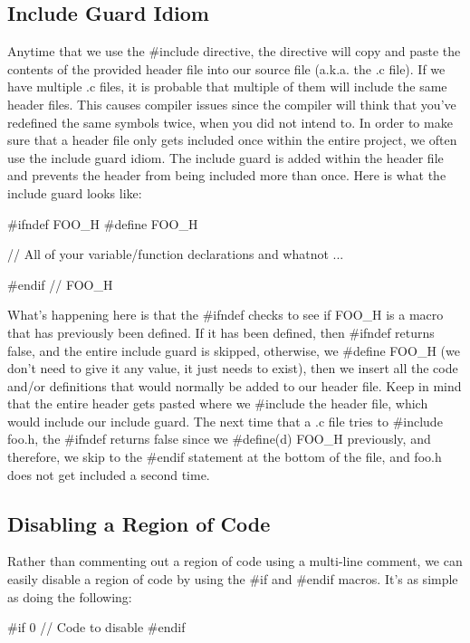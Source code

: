 \documentclass{article}
\begin{document}
\subsection{Include Guard Idiom}

Anytime that we use the \#include directive, the directive will copy and paste the contents of the provided
header file into our source file (a.k.a. the .c file). If we have multiple .c files, it is probable that
multiple of them will include the same header files. This causes compiler issues since the compiler will think
that you've redefined the same symbols twice, when you did not intend to. In order to make sure that a header
file only gets included once within the entire project, we often use the include guard idiom. The include
guard is added within the header file and prevents the header from being included more than once. Here is what
the include guard looks like:

\begin{clst}
#ifndef FOO_H
#define FOO_H

// All of your variable/function declarations and whatnot
...

#endif // FOO_H
\end{clst}

What's happening here is that the \#ifndef checks to see if FOO\_H is a macro that has previously been defined.
If it has been defined, then \#ifndef returns false, and the entire include guard is skipped, otherwise, we
\#define FOO\_H (we don't need to give it any value, it just needs to exist), then we insert all the code
and/or definitions that would normally be added to our header file. Keep in mind that the entire header gets
pasted where we \#include the header file, which would include our include guard. The next time that a .c file
tries to \#include foo.h, the \#ifndef returns false since we \#define(d) FOO\_H previously, and therefore, we
skip to the \#endif statement at the bottom of the file, and foo.h does not get included a second time.

\subsection{Disabling a Region of Code}

Rather than commenting out a region of code using a multi-line comment, we can easily disable a region of code
by using the \#if and \#endif macros. It's as simple as doing the following:

\begin{clst}
#if 0
// Code to disable
#endif
\end{clst}
\end{document}
